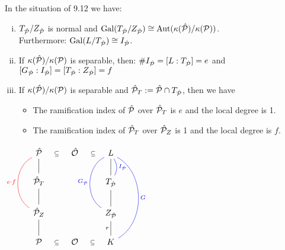 \begin{Prop}
In the situation of 9.12 we have:
\begin{enumerate}[i)]
\item $T_{\hat{\mathcal{P}}}/Z_{\hat{\mathcal{P}}}$ is normal and $\operatorname{Gal}(T_{\hat{\mathcal{P}}}/Z_{\hat{\mathcal{P}}}) \cong \operatorname{Aut}(\kappa(\hat{\mathcal{P}})/\kappa(\mathcal{P}))$.\\ Furthermore: $\operatorname{Gal}(L/T_{\hat{\mathcal{P}}}) \cong I_{\hat{\mathcal{P}}}$.
\item If $\kappa(\hat{\mathcal{P}})/\kappa(\mathcal{P})$ is separable, then: $\#I_{\hat{\mathcal{P}}} = [L:T_{\hat{\mathcal{P}}}]=e$ and $[G_{\hat{\mathcal{P}}}:I_{\hat{\mathcal{P}}}]=[T_{\hat{\mathcal{P}}}:Z_{\hat{\mathcal{P}}}]=f$
\item If $\kappa(\hat{\mathcal{P}})/\kappa(\mathcal{P})$ is separable and $\hat{\mathcal{P}}_T:=\hat{\mathcal{P}} \cap T_{\hat{\mathcal{P}}}$, then we have
\begin{itemize}
\item The ramification index of $\hat{\mathcal{P}}$ over $\hat{\mathcal{P}}_T$ is $e$ and the local degree is 1.
\item The ramification index of $\hat{\mathcal{P}}_T$ over $\hat{\mathcal{P}}_Z$ is 1 and the local degree is $f$.
\end{itemize}
\end{enumerate}
\end{Prop}

$ \begin{tikzcd}
\hP \arrow[draw=none]{r}[sloped,auto=false]{\subseteq} & \hO \arrow[draw=none]{r}[sloped,auto=false]{\subseteq} & L\\
\hP_T \arrow[dash]{u}&	& T_{\hP} \arrow[dash]{u} \arrow[dash, bend right=30, color=blue]{u}[right]{I_{\hP}}\\
\hP_Z \arrow[dash]{u} \arrow[dash, bend left=60, color=red]{uu}[left]{e\cdot f}&	& \ZP \arrow[dash]{u} \arrow[dash, bend left=60, color=blue]{uu}[left]{\GP}\\
\PP \arrow[dash]{u} \arrow[draw=none]{r}[sloped,auto=false]{\subseteq}&\O \arrow[draw=none]{r}[sloped,auto=false]{\subseteq}& K \arrow[dash]{u}{r} \arrow[dash, bend right=60, color=blue]{uuu}[right]{G}
\end{tikzcd}
$


